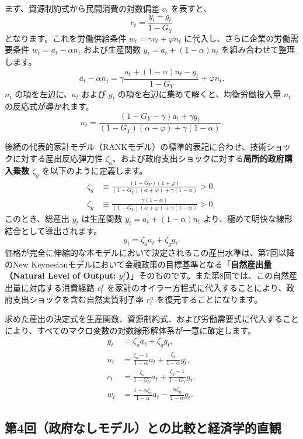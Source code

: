 \documentclass[
  japanese,
  lualatex,
  ja=standard,
  12pt,
  a4paper]{ltjsarticle}
\begin{document}
まず、資源制約式から民間消費の対数偏差 \(c_t\) を表すと、 \[
c_t = \frac{y_t - g_t}{1-G_Y}
\] となります。これを労働供給条件 \(w_t = \gamma c_t + \varphi n_t\)
に代入し、さらに企業の労働需要条件 \(w_t = a_t - \alpha n_t\)
および生産関数 \(y_t = a_t + (1-\alpha)n_t\) を組み合わせて整理します。
\[
a_t - \alpha n_t = \gamma \frac{a_t + (1-\alpha)n_t - g_t}{1-G_Y} + \varphi n_t.
\] \(n_t\) の項を左辺に、\(a_t\) および \(g_t\)
の項を右辺に集めて解くと、均衡労働投入量 \(n_t\) の反応式が導かれます。
\[
n_t = \frac{(1-G_Y-\gamma) a_t + \gamma g_t}{(1-G_Y)(\alpha+\varphi) + \gamma(1-\alpha)}.
\]

後続の代表的家計モデル（RANKモデル）の標準的表記に合わせ、技術ショックに対する産出反応弾力性
\(\zeta_a\)、および政府支出ショックに対する\textbf{局所的政府購入乗数
\(\zeta_g\)} を以下のように定義します。 \[
\begin{aligned}
\zeta_a &\equiv \frac{(1-G_Y)(1+\varphi)}{(1-G_Y)(\alpha+\varphi) + \gamma(1-\alpha)} > 0,\\
\zeta_g &\equiv \frac{\gamma(1-\alpha)}{(1-G_Y)(\alpha+\varphi) + \gamma(1-\alpha)} > 0.
\end{aligned}
\] このとき、総産出 \(y_t\) は生産関数 \(y_t = a_t + (1-\alpha)n_t\)
より、極めて明快な線形結合として導出されます。 \[
y_t = \zeta_a a_t + \zeta_g g_t.
\]
価格が完全に伸縮的な本モデルにおいて決定されるこの産出水準は、第7回以降のNew
Keynesianモデルにおいて金融政策の目標基準となる「\textbf{自然産出量（Natural
Level of Output:
\(y_t^f\)）}」そのものです。また第8回では、この自然産出量に対応する消費経路
\(c_t^f\)
を家計のオイラー方程式に代入することにより、政府支出ショックを含む自然実質利子率
\(r_t^n\) を復元することになります。

求めた産出の決定式を生産関数、資源制約式、および労働需要式に代入することにより、すべてのマクロ変数の対数線形解体系が一意に確定します。
\[
\begin{aligned}
y_t &= \zeta_a a_t + \zeta_g g_t,\\
n_t &= \frac{\zeta_a - 1}{1-\alpha} a_t + \frac{\zeta_g}{1-\alpha} g_t,\\
c_t &= \frac{\zeta_a}{1-G_Y} a_t + \frac{\zeta_g - 1}{1-G_Y} g_t,\\
w_t &= \frac{1-\alpha\zeta_a}{1-\alpha} a_t - \frac{\alpha\zeta_g}{1-\alpha} g_t.
\end{aligned}
\]

\subsection{第4回（政府なしモデル）との比較と経済学的直観}\label{ux7b2c4ux56deux653fux5e9cux306aux3057ux30e2ux30c7ux30ebux3068ux306eux6bd4ux8f03ux3068ux7d4cux6e08ux5b66ux7684ux76f4ux89b3}
\end{document}
